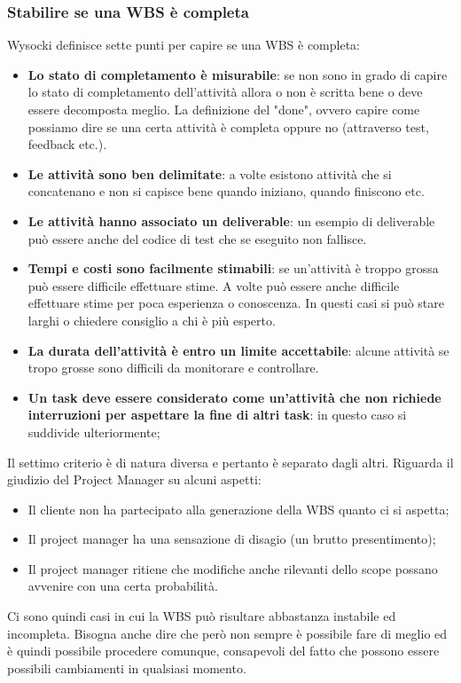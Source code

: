 \subsubsection{Stabilire se una WBS è completa}
Wysocki definisce sette punti per capire se una WBS è completa:
\begin{itemize}
	\item \textbf{Lo stato di completamento è misurabile}: se non sono in grado di capire lo stato di completamento dell'attività allora o non è scritta bene o deve essere decomposta meglio. La definizione del "done", ovvero capire come possiamo dire se una certa attività è completa oppure no (attraverso test, feedback etc.).
	\item \textbf{Le attività sono ben delimitate}: a volte esistono attività che si concatenano e non si capisce bene quando iniziano, quando finiscono etc.
	\item \textbf{Le attività hanno associato un deliverable}: un esempio di deliverable può essere anche del codice di test che se eseguito non fallisce.
	\item \textbf{Tempi e costi sono facilmente stimabili}: se un'attività è troppo grossa può essere difficile effettuare stime. A volte può essere anche difficile effettuare stime per poca esperienza o conoscenza. In questi casi si può stare larghi o chiedere consiglio a chi è più esperto.
	\item \textbf{La durata dell'attività è entro un limite accettabile}: alcune attività se tropo grosse sono difficili da monitorare e controllare.
	\item \textbf{Un task deve essere considerato come un'attività che non richiede interruzioni per aspettare la fine di altri task}: in questo caso si suddivide ulteriormente;
\end{itemize}

\noindent Il settimo criterio è di natura diversa e pertanto è separato dagli altri. Riguarda il giudizio del Project Manager su alcuni aspetti:
\begin{itemize}
	\item Il cliente non ha partecipato alla generazione della WBS quanto ci si aspetta;
	\item Il project manager ha una sensazione di disagio (un brutto presentimento);
	\item Il project manager ritiene che modifiche anche rilevanti dello scope possano avvenire con una certa probabilità.
\end{itemize}
Ci sono quindi casi in cui la WBS può risultare abbastanza instabile ed incompleta. Bisogna anche dire che però non sempre è possibile fare di meglio ed è quindi possibile procedere comunque, consapevoli del fatto che possono essere possibili cambiamenti in qualsiasi momento.

